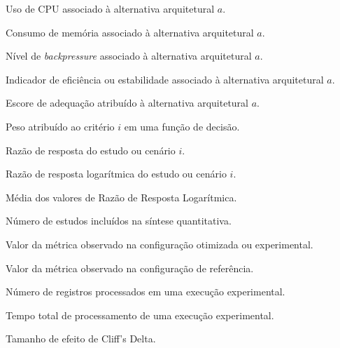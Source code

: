 \begin{simbolos}
\item[$U_{cpu,a}$] Uso de CPU associado à alternativa arquitetural $a$.

\item[$U_{mem,a}$] Consumo de memória associado à alternativa arquitetural $a$.

\item[$B_a$] Nível de \textit{backpressure} associado à alternativa arquitetural $a$.

\item[$E_a$] Indicador de eficiência ou estabilidade associado à alternativa arquitetural $a$.

\item[$S(a)$] Escore de adequação atribuído à alternativa arquitetural $a$.

\item[$w_i$] Peso atribuído ao critério $i$ em uma função de decisão.

\item[$RR_i$] Razão de resposta do estudo ou cenário $i$.

\item[$LRR_i$] Razão de resposta logarítmica do estudo ou cenário $i$.

\item[$\overline{LRR}$] Média dos valores de Razão de Resposta Logarítmica.

\item[$k$] Número de estudos incluídos na síntese quantitativa.

\item[$M_{tratamento}$] Valor da métrica observado na configuração otimizada ou experimental.

\item[$M_{baseline}$] Valor da métrica observado na configuração de referência.

\item[$N_{registros}$] Número de registros processados em uma execução experimental.

\item[$T_{processamento}$] Tempo total de processamento de uma execução experimental.

\item[$\delta$] Tamanho de efeito de Cliff's Delta.


\end{simbolos}
